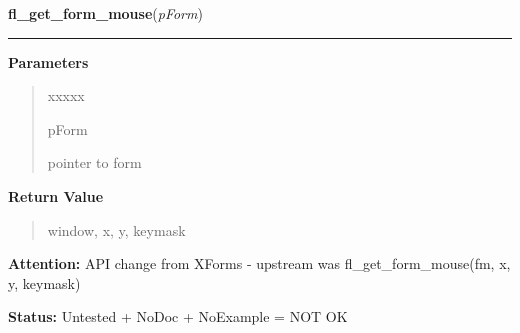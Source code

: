     \vspace{0.5ex}

\hspace{.8\funcindent}\begin{boxedminipage}{\funcwidth}

    \raggedright \textbf{fl\_get\_form\_mouse}(\textit{pForm})

    \vspace{-1.5ex}

    \rule{\textwidth}{0.5\fboxrule}
\setlength{\parskip}{2ex}
\setlength{\parskip}{1ex}
      \textbf{Parameters}
      \vspace{-1ex}

      \begin{quote}
        \begin{Ventry}{xxxxx}

          \item[pForm]

          pointer to form

        \end{Ventry}

      \end{quote}

      \textbf{Return Value}
    \vspace{-1ex}

      \begin{quote}
      window, x, y, keymask

      \end{quote}

\textbf{Attention:} API change from XForms - upstream was fl\_get\_form\_mouse(fm, x, y, 
keymask)



\textbf{Status:} Untested + NoDoc + NoExample = NOT OK



    \end{boxedminipage}

    \label{xformslib:library:fl_win_to_form}

    \vspace{0.5ex}

